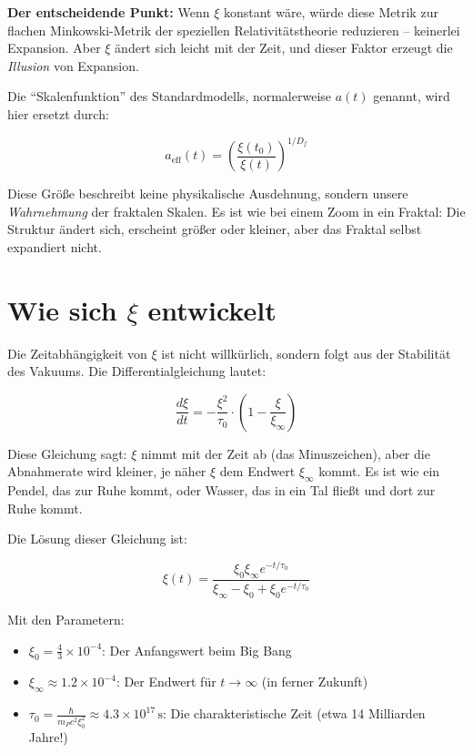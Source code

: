 \documentclass[12pt,a4paper]{article}
\begin{document}
\textbf{Der entscheidende Punkt:} Wenn $\xi$ konstant wäre, würde diese Metrik zur flachen Minkowski-Metrik der speziellen Relativitätstheorie reduzieren -- keinerlei Expansion. Aber $\xi$ ändert sich leicht mit der Zeit, und dieser Faktor erzeugt die \textit{Illusion} von Expansion.

Die ``Skalenfunktion'' des Standardmodells, normalerweise $a(t)$ genannt, wird hier ersetzt durch:

\begin{equation}
a_{\text{eff}}(t) = \left(\frac{\xi(t_0)}{\xi(t)}\right)^{1/D_f}
\end{equation}

Diese Größe beschreibt keine physikalische Ausdehnung, sondern unsere \textit{Wahrnehmung} der fraktalen Skalen. Es ist wie bei einem Zoom in ein Fraktal: Die Struktur ändert sich, erscheint größer oder kleiner, aber das Fraktal selbst expandiert nicht.

\section{Wie sich $\xi$ entwickelt}

Die Zeitabhängigkeit von $\xi$ ist nicht willkürlich, sondern folgt aus der Stabilität des Vakuums. Die Differentialgleichung lautet:

\begin{equation}
\frac{d\xi}{dt} = -\frac{\xi^2}{\tau_0} \cdot \left(1 - \frac{\xi}{\xi_{\infty}}\right)
\end{equation}

Diese Gleichung sagt: $\xi$ nimmt mit der Zeit ab (das Minuszeichen), aber die Abnahmerate wird kleiner, je näher $\xi$ dem Endwert $\xi_{\infty}$ kommt. Es ist wie ein Pendel, das zur Ruhe kommt, oder Wasser, das in ein Tal fließt und dort zur Ruhe kommt.

Die Lösung dieser Gleichung ist:

\begin{equation}
\xi(t) = \frac{\xi_0 \xi_{\infty} e^{-t/\tau_0}}{\xi_{\infty} - \xi_0 + \xi_0 e^{-t/\tau_0}}
\end{equation}

Mit den Parametern:
\begin{itemize}[leftmargin=*]
\item $\xi_0 = \frac{4}{3} \times 10^{-4}$: Der Anfangswert beim Big Bang
\item $\xi_{\infty} \approx 1.2 \times 10^{-4}$: Der Endwert für $t \to \infty$ (in ferner Zukunft)
\item $\tau_0 = \frac{\hbar}{m_P c^2 \xi_0^2} \approx 4.3 \times 10^{17} \, \text{s}$: Die charakteristische Zeit (etwa 14 Milliarden Jahre!)
\end{itemize}
\end{document}

